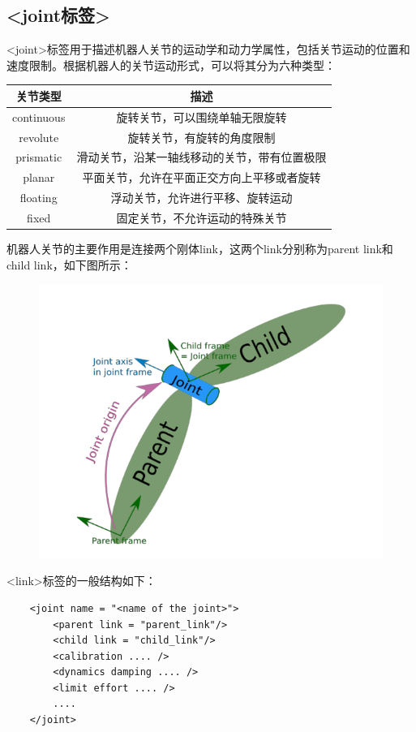 \documentclass[10pt, oneside]{book}
\begin{document}
\subsection{<joint标签>}

<joint>标签用于描述机器人关节的运动学和动力学属性，包括关节运动的位置和速度限制。根据机器人的关节运动形式，可以将其分为六种类型：

\begin{table}[H]
    \centering
    \begin{tabular}{c|c}
    \hline
    \textbf{关节类型} & \textbf{描述}            \\ \hline
    continuous    & 旋转关节，可以围绕单轴无限旋转        \\ \hline
    revolute      & 旋转关节，有旋转的角度限制          \\ \hline
    prismatic     & 滑动关节，沿某一轴线移动的关节，带有位置极限 \\ \hline
    planar        & 平面关节，允许在平面正交方向上平移或者旋转  \\ \hline
    floating      & 浮动关节，允许进行平移、旋转运动       \\ \hline
    fixed         & 固定关节，不允许运动的特殊关节        \\ \hline
    \end{tabular}
\end{table}

机器人关节的主要作用是连接两个刚体link，这两个link分别称为parent link和child link，如下图所示：

\begin{figure}[H]
    \centering
    \includegraphics[width = 0.5\linewidth]{image/joint标签.png}
\end{figure}

<link>标签的一般结构如下：

\begin{verbatim}
    <joint name = "<name of the joint>">
        <parent link = "parent_link"/>
        <child link = "child_link"/>
        <calibration .... />
        <dynamics damping .... />
        <limit effort .... />
        ....
    </joint>
\end{verbatim}
\end{document}

